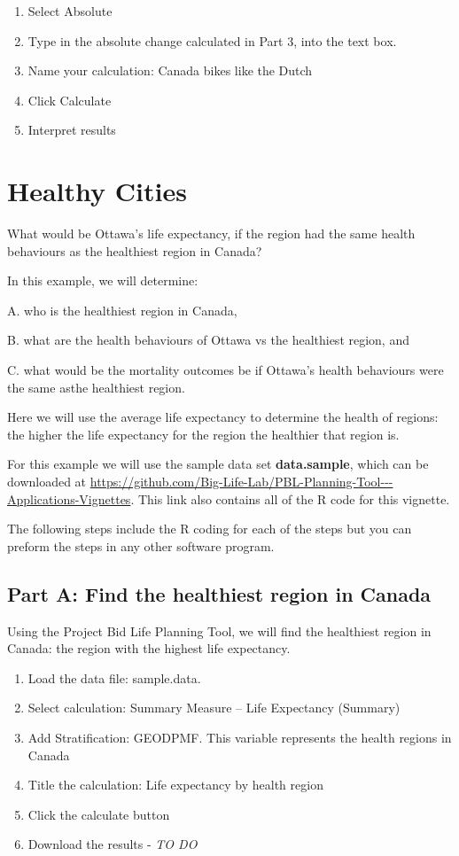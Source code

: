 \documentclass[]{book}
\begin{document}
\begin{enumerate}
\def\labelenumi{\arabic{enumi}.}
\setcounter{enumi}{5}
\item
  Select Absolute
\item
  Type in the absolute change calculated in Part 3, into the text box.
\item
  Name your calculation: Canada bikes like the Dutch
\item
  Click Calculate
\item
  Interpret results
\end{enumerate}

\section{Healthy Cities}\label{healthy-cities}

What would be Ottawa's life expectancy, if the region had the same
health behaviours as the healthiest region in Canada?

In this example, we will determine:

A. who is the healthiest region in Canada,

B. what are the health behaviours of Ottawa vs the healthiest region,
and

C. what would be the mortality outcomes be if Ottawa's health behaviours
were the same asthe healthiest region.

Here we will use the average life expectancy to determine the health of
regions: the higher the life expectancy for the region the healthier
that region is.

For this example we will use the sample data set \textbf{data.sample},
which can be downloaded at
\url{https://github.com/Big-Life-Lab/PBL-Planning-Tool---Applications-Vignettes}.
This link also contains all of the R code for this vignette.

The following steps include the R coding for each of the steps but you
can preform the steps in any other software program.

\subsection{Part A: Find the healthiest region in
Canada}\label{part-a-find-the-healthiest-region-in-canada}

Using the Project Bid Life Planning Tool, we will find the healthiest
region in Canada: the region with the highest life expectancy.

\begin{enumerate}
\def\labelenumi{\arabic{enumi}.}
\item
  Load the data file: sample.data.
\item
  Select calculation: Summary Measure -- Life Expectancy (Summary)
\item
  Add Stratification: GEODPMF. This variable represents the health
  regions in Canada
\item
  Title the calculation: Life expectancy by health region
\item
  Click the calculate button
\item
  Download the results - \emph{TO DO}
\end{enumerate}
\end{document}
